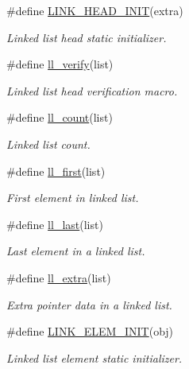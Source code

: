 \begin{CompactItemize}
\item 
\#define \hyperlink{group__dbprim__link_a13}{LINK\_\-HEAD\_\-INIT}(extra)
\begin{CompactList}\small\item\em Linked list head static initializer.\item\end{CompactList}\item 
\#define \hyperlink{group__dbprim__link_a14}{ll\_\-verify}(list)
\begin{CompactList}\small\item\em Linked list head verification macro.\item\end{CompactList}\item 
\#define \hyperlink{group__dbprim__link_a15}{ll\_\-count}(list)
\begin{CompactList}\small\item\em Linked list count.\item\end{CompactList}\item 
\#define \hyperlink{group__dbprim__link_a16}{ll\_\-first}(list)
\begin{CompactList}\small\item\em First element in linked list.\item\end{CompactList}\item 
\#define \hyperlink{group__dbprim__link_a17}{ll\_\-last}(list)
\begin{CompactList}\small\item\em Last element in a linked list.\item\end{CompactList}\item 
\#define \hyperlink{group__dbprim__link_a18}{ll\_\-extra}(list)
\begin{CompactList}\small\item\em Extra pointer data in a linked list.\item\end{CompactList}\item 
\#define \hyperlink{group__dbprim__link_a19}{LINK\_\-ELEM\_\-INIT}(obj)
\begin{CompactList}\small\item\em Linked list element static initializer.\item\end{CompactList}\item 

\end{CompactItemize}
